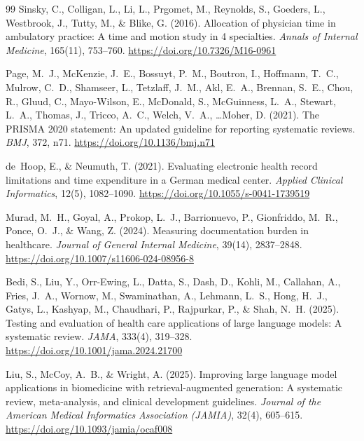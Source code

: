 \documentclass[11pt,a4paper]{article}
\begin{document}
\begin{thebibliography}{99}
Sinsky, C., Colligan, L., Li, L., Prgomet, M., Reynolds, S., Goeders, L., Westbrook, J., Tutty, M., \& Blike, G. (2016).
\newblock Allocation of physician time in ambulatory practice: A time and motion study in 4 specialties.
\newblock \textit{Annals of Internal Medicine}, 165(11), 753--760.
\newblock \url{https://doi.org/10.7326/M16-0961}

Page, M.~J., McKenzie, J.~E., Bossuyt, P.~M., Boutron, I., Hoffmann, T.~C., Mulrow, C.~D., Shamseer, L., Tetzlaff, J.~M.,
Akl, E.~A., Brennan, S.~E., Chou, R., Gluud, C., Mayo-Wilson, E., McDonald, S., McGuinness, L.~A., Stewart, L.~A., Thomas, J.,
Tricco, A.~C., Welch, V.~A., \ldots Moher, D. (2021).
\newblock The PRISMA 2020 statement: An updated guideline for reporting systematic reviews.
\newblock \textit{BMJ}, 372, n71.
\newblock \url{https://doi.org/10.1136/bmj.n71}

de~Hoop, E., \& Neumuth, T. (2021).
\newblock Evaluating electronic health record limitations and time expenditure in a German medical center.
\newblock \textit{Applied Clinical Informatics}, 12(5), 1082--1090.
\newblock \url{https://doi.org/10.1055/s-0041-1739519}

Murad, M.~H., Goyal, A., Prokop, L.~J., Barrionuevo, P.,
Gionfriddo, M.~R., Ponce, O.~J., \& Wang, Z. (2024).
\newblock Measuring documentation burden in healthcare.
\newblock \textit{Journal of General Internal Medicine},
39(14), 2837--2848.
\newblock \url{https://doi.org/10.1007/s11606-024-08956-8}

Bedi, S., Liu, Y., Orr-Ewing, L., Datta, S., Dash, D.,
Kohli, M., Callahan, A., Fries, J.~A., Wornow, M.,
Swaminathan, A., Lehmann, L.~S., Hong, H.~J., Gatys, L.,
Kashyap, M., Chaudhari, P., Rajpurkar, P., \& Shah, N.~H.
(2025).
\newblock Testing and evaluation of health care applications
of large language models: A systematic review.
\newblock \textit{JAMA}, 333(4), 319--328.
\newblock \url{https://doi.org/10.1001/jama.2024.21700}

Liu, S., McCoy, A.~B., \& Wright, A. (2025).
\newblock Improving large language model applications in
biomedicine with retrieval-augmented generation: A systematic
review, meta-analysis, and clinical development guidelines.
\newblock \textit{Journal of the American Medical Informatics
Association (JAMIA)}, 32(4), 605--615.
\newblock \url{https://doi.org/10.1093/jamia/ocaf008}


\end{thebibliography}
\end{document}
